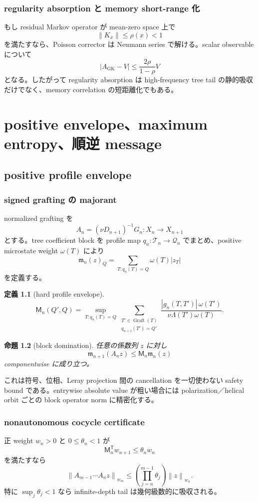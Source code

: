\documentclass[11pt,a4paper,openany]{book}
\newtheorem{definition}{定義}[chapter]
\newtheorem{proposition}[definition]{命題}
\numberwithin{equation}{chapter}
\newcommand{\cQ}{\mathcal Q}
\newcommand{\cT}{\mathcal T}
\newcommand{\norm}[1]{\left\lVert #1\right\rVert}
\newcommand{\abs}[1]{\left\lvert #1\right\rvert}
\begin{document}
\section{regularity absorption と memory short-range 化}
もし residual Markov operator が mean-zero space 上で
\[
\norm{K_x}\le\rho(x)<1
\]
を満たすなら、Poisson corrector は Neumann series で解ける。scalar observable について
\[
\abs{A_{\mathrm{GK}}-V}
\le
\frac{2\rho}{1-\rho}V
\]
となる。したがって regularity absorption は high-frequency tree tail の静的吸収だけでなく、memory correlation の短距離化でもある。

\part{positive envelope、maximum entropy、順逆 message}

\chapter{positive profile envelope}
\section{signed grafting の majorant}
normalized grafting を
\[
A_n=(\nu D_{n+1})^{-1}G_n:X_n\to X_{n+1}
\]
とする。tree coefficient block を profile map $q_n:\cT_n\to\cQ_n$ でまとめ、positive microstate weight $\omega(T)$ により
\[
\mathfrak m_n(z)_Q
=\sum_{T:q_n(T)=Q}\omega(T)|z_T|
\]
を定義する。

\begin{definition}[hard profile envelope]
\[
\mathsf M_n(Q',Q)
=\sup_{T:q_n(T)=Q}
\sum_{\substack{T'\in\operatorname{Graft}(T)\\q_{n+1}(T')=Q'}}
\frac{|g_n(T,T')|\,\omega(T')}{\nu\Lambda(T')\omega(T)}.
\]
\end{definition}

\begin{proposition}[block domination]
任意の係数列 $z$ に対し
\[
\mathfrak m_{n+1}(A_nz)
\le
\mathsf M_n\mathfrak m_n(z)
\]
componentwise に成り立つ。
\end{proposition}
これは符号、位相、Leray projection 間の cancellation を一切使わない safety bound である。entrywise absolute value が粗い場合には polarization／helical orbit ごとの block operator norm に精密化する。

\section{nonautonomous cocycle certificate}
正 weight $w_n>0$ と $0\le\theta_n<1$ が
\[
\mathsf M_n^{\mathsf T}w_{n+1}\le\theta_nw_n
\]
を満たすなら
\[
\norm{A_{m-1}\cdots A_nz}_{w_m}
\le
\left(\prod_{j=n}^{m-1}\theta_j\right)
\norm z_{w_n}.
\]
特に $\sup_j\theta_j<1$ なら infinite-depth tail は幾何級数的に吸収される。
\end{document}
